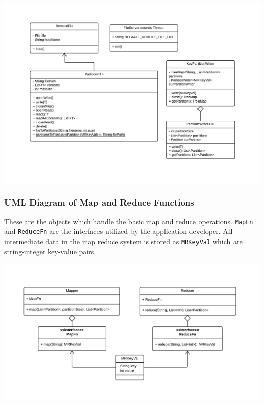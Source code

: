 \documentclass[12pt]{article}
\newcommand{\ttt}{\texttt}
\begin{document}
\includegraphics[scale=.7]{MapReduceFileIO_UML.png}

\subsubsection{UML Diagram of Map and Reduce Functions}
These are the objects which handle the basic map and reduce operations. \ttt{MapFn} and \ttt{ReduceFn} are the interfaces utilized by the application developer. All intermediate data in the map reduce system is stored as \ttt{MRKeyVal} which are string-integer key-value pairs.

\includegraphics[scale=.7]{MapReduceFN_UML.png}
\end{document}
